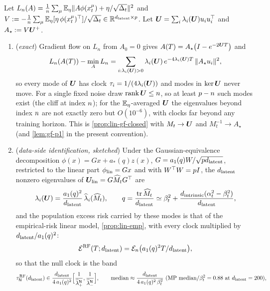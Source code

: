 \begin{corollary}\label{cor:lin-rfnn}
Let $L_n(A)=\frac1n\sum_{\mu}\mathbb{E}_\eta\|A\phi(x_t^\mu)+\eta/\sqrt{\Delta_t}\|^2$ and $V:=-\frac1n\sum_\mu\mathbb{E}_\eta[\eta\,\phi(x_t^\mu)^{\top}]/\sqrt{\Delta_t}\in\mathbb{R}^{d_{\mathrm{latent}}\times p}$. Let $\bm{U}=\sum_{i}\lambda_i(\bm{U})u_iu_i^{\top}$ and $A_\star:=V\bm{U}^{+}$.
\begin{enumerate}
\item[(a)] (\emph{exact}) Gradient flow on $L_n$ from $A_0=0$ gives $A(T)=A_\star\big(I-e^{-2\bm{U} T}\big)$ and
\begin{equation}\label{eq:rfnn-excess}
L_n(A(T))-\min_AL_n=\sum_{i:\lambda_i(\bm{U})>0}\lambda_i(\bm{U})\,e^{-4\lambda_i(\bm{U})T}\,\|A_\star u_i\|^2 ,
\end{equation}
so every mode of $\bm{U}$ has clock $\tau_i=1/(4\lambda_i(\bm{U}))$ and modes in $\ker\bm{U}$ never move. For a single fixed noise draw $\operatorname{rank}\bm{U}\le n$, so at least $p-n$ such modes exist (the cliff at index $n$); for the $\mathbb{E}_\eta$-averaged $\bm{U}$ the eigenvalues beyond index $n$ are not exactly zero but $O(10^{-6})$, with clocks far beyond any training horizon. This is \cref{prop:lin-gf-closed} with $M_t\to\bm{U}$ and $M_t^{-1}\to A_\star$ (and \cref{lem:gf-p1} in the present convention).
\item[(b)] (\emph{data-side identification, sketched}) Under the Gaussian-equivalence decomposition $\phi(x)=Gx+a_*(q)z(x)$, $G=a_1(q)W/\sqrt{pd_{\mathrm{latent}}}$, restricted to the linear part $\phi_{\rm lin}=Gx$ and with $W^{\top}W=p I$, the $d_{\mathrm{latent}}$ nonzero eigenvalues of $\bm{U}_{\rm lin}=G\widehat M_tG^{\top}$ are
\begin{equation}\label{eq:rfnn-eig-id}
\lambda_i(\bm{U})=\frac{a_1(q)^2}{d_{\mathrm{latent}}}\,\widehat\lambda_i(\widehat M_t),\qquad q=\frac{\operatorname{tr}\widehat M_t}{d_{\mathrm{latent}}}\simeq\beta_t^2+\frac{d_{\mathrm{intrinsic}}(\alpha_t^2-\beta_t^2)}{d_{\mathrm{latent}}},
\end{equation}
and the population excess risk carried by these modes is that of the empirical-risk linear model, \cref{prop:lin-emp}, with every clock multiplied by $d_{\mathrm{latent}}/a_1(q)^2$:
\begin{equation}\label{eq:rfnn-risk-id}
\mathcal E^{\rm RF}(T;d_{\mathrm{latent}})=\mathcal E_n\big(a_1(q)^2T/d_{\mathrm{latent}}\big),
\end{equation}
so that the null clock is the band
\begin{equation}\label{eq:rfnn-null-clock}
\tau_{\mathsf N}^{\rm RF}(\dlat)\in\frac{\dlat}{4\,a_1(q)^2}\Big[\frac1{\widehat\lambda^{\mathsf N}_+},\frac1{\widehat\lambda^{\mathsf N}_-}\Big],\qquad \text{median}\approx\frac{\dlat}{4\,a_1(q)^2\,\beta_t^2}\ (\text{MP median}/\beta_t^2=0.88\text{ at }\dlat=200),

\end{equation}
\end{enumerate}
\end{corollary}
